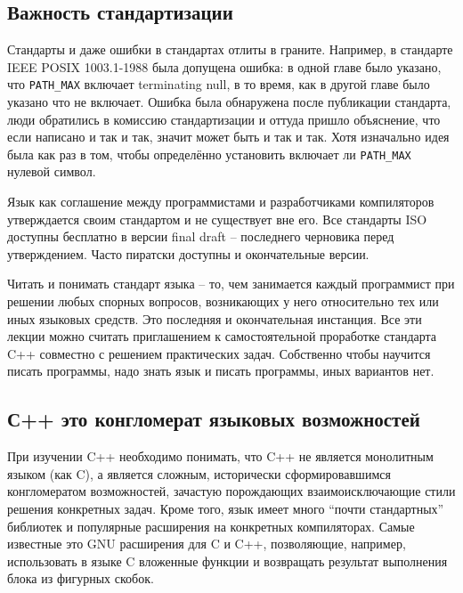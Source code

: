\documentclass[a4paper,12pt,oneside]{article}
\begin{document}
\subsection{Важность стандартизации}

Стандарты и даже ошибки в стандартах отлиты в граните. Например, в стандарте IEEE POSIX 1003.1-1988 была допущена ошибка: в одной главе было указано, что \lstinline!PATH_MAX! включает terminating null, в то время, как в другой главе было указано что не включает. Ошибка была обнаружена после публикации стандарта, люди обратились в комиссию стандартизации и оттуда пришло объяснение, что если написано и так и так, значит может быть и так и так. Хотя изначально идея была как раз в том, чтобы определённо установить включает ли \lstinline!PATH_MAX! нулевой символ.

Язык как соглашение между программистами и разработчиками компиляторов утверждается своим стандартом и не существует вне его. Все стандарты ISO доступны бесплатно в версии final draft – последнего черновика перед утверждением. Часто пиратски доступны и окончательные версии.

Читать и понимать стандарт языка – то, чем занимается каждый программист при решении любых спорных вопросов, возникающих у него относительно тех или иных языковых средств. Это последняя и окончательная инстанция.
Все эти лекции можно считать приглашением к самостоятельной проработке стандарта C++ совместно с решением практических задач. Собственно чтобы научится писать программы, надо знать язык и писать программы, иных вариантов нет.

\subsection{С++ это конгломерат языковых возможностей}

При изучении C++ необходимо понимать, что C++ не является монолитным языком (как C), а является сложным, исторически сформировавшимся конгломератом возможностей, зачастую порождающих взаимоисключающие стили решения конкретных задач. Кроме того, язык имеет много ``почти стандартных'' библиотек и популярные расширения на конкретных компиляторах. Самые известные это GNU расширения для C и C++, позволяющие, например, использовать в языке C вложенные функции и возвращать результат выполнения блока из фигурных скобок.
\end{document}
